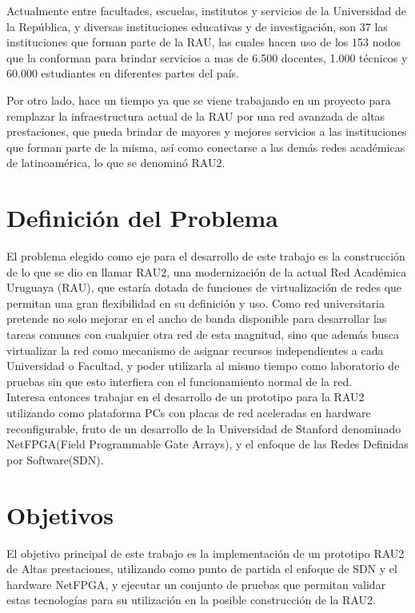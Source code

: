 Actualmente entre facultades, escuelas, institutos y servicios de la Universidad de la República, y diversas instituciones educativas y de investigación, son 37 las instituciones que forman parte de la RAU, las cuales hacen uso de los 153 nodos que la conforman para brindar servicios a mas de 6.500 docentes, 1.000 técnicos y 60.000 estudiantes en diferentes partes del país.

Por otro lado, hace un tiempo ya que se viene trabajando en un proyecto para remplazar la infraestructura actual de la RAU por una red avanzada de altas prestaciones, que pueda brindar de mayores y mejores servicios a las instituciones que forman parte de la misma, así como conectarse a las demás redes académicas de latinoam\'erica, lo que se denomin\'o RAU2.  

\section{Definición del Problema}

El problema elegido como eje para el desarrollo de este trabajo es la 
construcción de lo que se dio en llamar RAU2, una modernización de la actual Red Académica Uruguaya (RAU), que estaría dotada de funciones de virtualización de redes que permitan una gran flexibilidad en su definición y uso. Como red universitaria pretende no solo mejorar en el ancho de banda disponible para desarrollar las tareas comunes con cualquier otra red de esta magnitud, sino que además busca virtualizar la red como mecanismo de asignar recursos independientes a cada Universidad o Facultad, y poder utilizarla al mismo tiempo como laboratorio de pruebas sin que esto interfiera con el funcionamiento normal de la red.\\

Interesa entonces trabajar en el desarrollo de un prototipo para la RAU2 utilizando como plataforma PCs con placas de red aceleradas en hardware reconfigurable, fruto de un desarrollo de la Universidad de Stanford denominado NetFPGA(Field Programmable Gate Arrays)\citep{NetFPGA}, y el enfoque de las Redes Definidas por Software(SDN)\citep{gude2008nox}\citep{SDNReadingList}.

\section{Objetivos}
El objetivo principal de este trabajo es la implementación de un prototipo RAU2 de Altas prestaciones, utilizando como punto de partida el enfoque de SDN y el hardware NetFPGA, y ejecutar un conjunto de pruebas que permitan validar estas tecnologías para su utilización en  la posible construcción de la RAU2.\\

